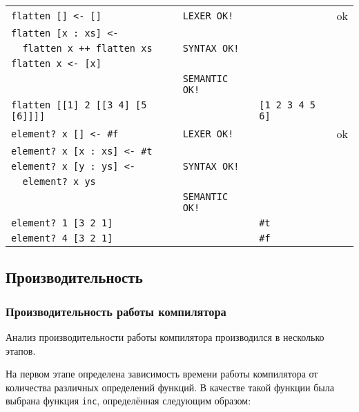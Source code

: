 \begin{longtable}[ht!]{|l|l|l|c|}
            \verb,flatten [] <- [],         & \verb,LEXER OK!,   &                 & ok \\
            \verb,flatten [x : xs] <- ,     &                    &                 & \\
            \verb,  flatten x ++ flatten xs,& \verb,SYNTAX OK!,  &                 & \\
            \verb,flatten x <- [x],         &                    &                 & \\
                                            & \verb,SEMANTIC OK!,&                 & \\
            \verb,flatten [[1] 2 [[3 4] [5 [6]]]],&              & \verb,[1 2 3 4 5 6],& \\ \hline

            \verb,element? x [] <- #f,      & \verb,LEXER OK!,   &                 & ok \\
            \verb,element? x [x : xs] <- #t,&                    &                 & \\
            \verb,element? x [y : ys] <-,   & \verb,SYNTAX OK!,  &                 & \\
            \verb,  element? x ys,          &                    &                 & \\
                                            & \verb,SEMANTIC OK!,&                 & \\
            \verb,element? 1 [3 2 1],       &                    & \verb,#t,       & \\
            \verb,element? 4 [3 2 1],       &                    & \verb,#f,       & \\ \hline
    \end{longtable}

    \subsection{Производительность}
        \subsubsection{Производительность работы компилятора}
        Анализ производительности работы компилятора производился в несколько этапов.

        На первом этапе определена зависимость времени работы компилятора от количества различных определений функций.
        В качестве такой функции была выбрана функция \verb,inc,, определённая следующим образом:

